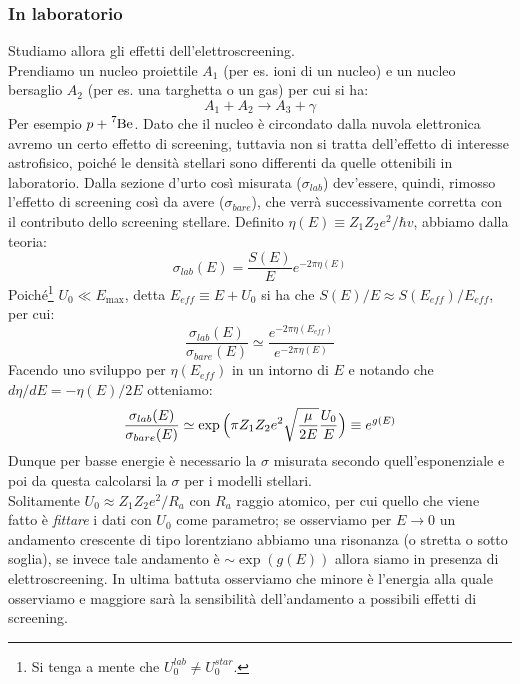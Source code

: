 \subsubsection{In laboratorio}
Studiamo allora gli effetti dell'elettroscreening.\\
Prendiamo un nucleo proiettile $A_1$ (per es. ioni di un nucleo) e un nucleo bersaglio $A_2$ (per es. una targhetta o un gas) per cui si ha:
$$A_1+A_2 \to A_3 + \gamma$$
Per esempio $p+\ce{^7Be}$. Dato che il nucleo è circondato dalla nuvola elettronica avremo un certo effetto di screening, tuttavia non si tratta dell'effetto di interesse astrofisico, poiché le densità stellari sono differenti da quelle ottenibili in laboratorio. Dalla sezione d'urto così misurata ($\sigma_{lab}$) dev'essere, quindi, rimosso l'effetto di screening così da avere ($\sigma_{bare}$), che verrà successivamente corretta con il contributo dello screening stellare. Definito $\eta(E)\equiv Z_1Z_2e^2/\hbar v$, abbiamo dalla teoria:
$$\sigma_{lab}(E) = \frac{S(E)}{E}e^{-2\pi \eta(E)}$$
Poiché\footnote{Si tenga a mente che $U_0^{lab}\not= U_{0}^{star}$.} $U_0\ll E_{\max{}}$, detta $E_{eff}\equiv E+U_0$ si ha che $S(E)/E\approx S(E_{eff})/E_{eff}$, per cui:
$$\frac{\sigma_{lab}(E)}{\sigma_{bare}(E)} \simeq \frac{e^{-2\pi\eta(E_{eff})}}{e^{-2\pi\eta(E)}}$$
Facendo uno sviluppo per $\eta(E_{eff})$ in un intorno di $E$ e notando che $d\eta/dE = -\eta(E)/2E$ otteniamo:
$$\frac{\sigma_{lab}(E)}{\sigma_{bare}(E)} \simeq \exp{\Bigl ( \pi Z_1Z_2e^2 \sqrt{\frac{\mu}{2E}}\frac{U_0}{E} \Bigr )}\equiv e^{g(E)}$$
Dunque per basse energie è necessario  la $\sigma$ misurata secondo quell'esponenziale e poi da questa calcolarsi la $\sigma$ per i modelli stellari.\\
Solitamente $U_0\approx Z_1Z_2 e^2/R_a$ con $R_a$ raggio atomico, per cui quello che viene fatto è \textit{fittare} i dati con $U_0$ come parametro; se osserviamo per $E\to0$ un andamento crescente di tipo lorentziano abbiamo una risonanza (o stretta o sotto soglia), se invece tale andamento è $\sim \exp{(g(E))}$ allora siamo in presenza di elettroscreening. In ultima battuta osserviamo che minore è l'energia alla quale osserviamo e maggiore sarà la sensibilità dell'andamento a possibili effetti di screening.
